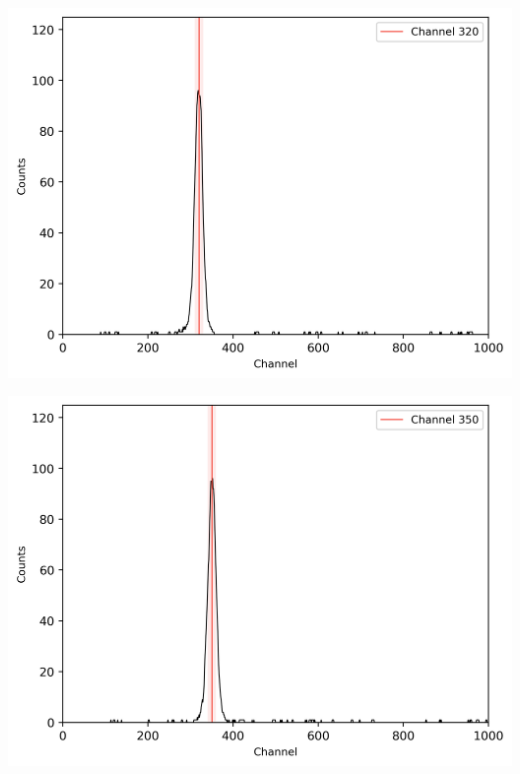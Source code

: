 %
\begin{center}
    \begin{adjustbox}{max width=\linewidth, keepaspectratio}
        \includegraphics[]{png/60CoZeitspektrum}
    \end{adjustbox}
    \label{fig:}
\end{center}
%
\begin{center}
    \begin{adjustbox}{max width=\linewidth, keepaspectratio}
        \includegraphics[]{png/60CoZeitspektrum20ns}
    \end{adjustbox}
    \label{fig:}
\end{center}
%
